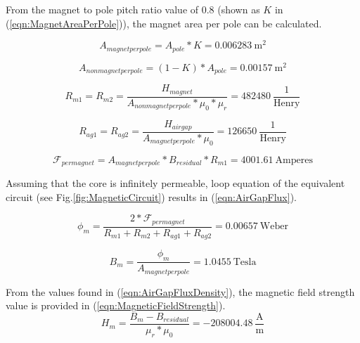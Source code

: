 \documentclass{article}
\begin{document}
\noindent From the magnet to pole pitch ratio value of 0.8 (shown as $K$ in (\ref{eqn:MagnetAreaPerPole})), the magnet area per pole can be calculated. 
\bigskip

\begin{equation} \label{eqn:MagnetAreaPerPole}
    A_{magnetperpole} = A_{pole}*K = 0.006283 \: \mathrm{m^2}
\end{equation}

\begin{equation} \label{eqn:NonMagnetAreaPerPole}
    A_{nonmagnetperpole} = (1-K)*A_{pole} = 0.00157 \: \mathrm{m^2}
\end{equation}

\begin{equation} \label{eqn:MagnetReluctance}
    R_{m1}  =  R_{m2} =  \frac{H_{magnet}}{A_{nonmagnetperpole}*\mu_0*\mu_r}  = 482480 \: \mathrm{\frac{1}{Henry}} 
\end{equation}

\begin{equation} \label{eqn:MagnetReluctance}
    R_{ag1}  =  R_{ag2} =  \frac{H_{airgap}}{A_{magnetperpole}*\mu_0}  =  126650  \: \mathrm{\frac{1}{Henry}} 
\end{equation}

\begin{equation} \label{eqn:MmfPerMagnet}
    \mathcal{F}_{permagnet} = A_{magnetperpole}*B_{residual}*R_{m1} = 4001.61 \: \mathrm{Amperes}
\end{equation}

\bigskip

\noindent Assuming that the core is infinitely permeable, loop equation of the equivalent circuit (see Fig.\ref{fig:MagneticCircuit}) results in (\ref{eqn:AirGapFlux}).
\bigskip

\begin{equation} \label{eqn:AirGapFlux}
    \phi_{m} = \frac{2*\mathcal{F}_{permagnet}}{R_{m1}+R_{m2}+R_{ag1}+R_{ag2}} = 0.00657 \: \mathrm{Weber}
\end{equation}

\begin{equation} \label{eqn:AirGapFluxDensity}
    B_{m} = \frac{\phi_{m}}{A_{magnetperpole}} = 1.0455 \: \mathrm{Tesla}
\end{equation}

\noindent From the values found in (\ref{eqn:AirGapFluxDensity}), the magnetic field strength value is provided in (\ref{eqn:MagneticFieldStrength}).
\begin{equation} \label{eqn:MagneticFieldStrength}
    H_m = \frac{B_m-B_{residual}}{\mu_r*\mu_0} = -208004.48 \: \mathrm{\frac{A}{m}}
\end{equation}
\end{document}

